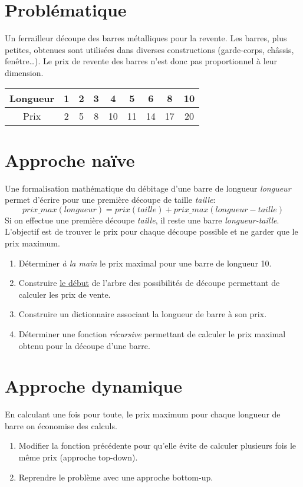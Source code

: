 \documentclass[a4paper,11pt]{article}
\begin{document}
\section{Problématique}
Un ferrailleur découpe des barres métalliques pour la revente. Les barres, plus petites, obtenues sont utilisées dans diverses constructions (garde-corps, châssis, fenêtre\dots). Le prix de revente des barres n'est donc pas proportionnel à leur dimension.
\begin{center}
    \begin{tabular}{|*{9}{c|}}
        \hline
        Longueur & 1 & 2 & 3 & 4 & 5 & 6 & 8 & 10 \\
        \hline
        Prix & 2 & 5 & 8 & 10 & 11 & 14 & 17 & 20 \\
        \hline
    \end{tabular}
\end{center}
\begin{center}
    
\end{center}
\section{Approche naïve}
Une formalisation mathématique du débitage d'une barre de longueur \emph{longueur} permet d'écrire pour une première découpe de taille \emph{taille}:
$$prix\_max(longueur) = prix(taille) + prix\_max(longueur-taille)$$
Si on effectue une première découpe \emph{taille}, il reste une barre \emph{longueur-taille}. L'objectif est de trouver le prix pour chaque découpe possible et ne garder que le prix maximum.
\begin{activite}
\begin{enumerate}
    \item Déterminer \emph{à la main} le prix maximal pour une barre de longueur 10.
    \item Construire \underline{le début} de l'arbre des possibilités de découpe permettant de calculer les prix de vente.
    \item Construire un dictionnaire associant la longueur de barre à son prix.
    \item Déterminer une fonction \emph{récursive} permettant de calculer le prix maximal obtenu pour la découpe d'une barre.   
\end{enumerate}
\end{activite}
\section{Approche dynamique}
En calculant une fois pour toute, le prix maximum pour chaque longueur de barre on économise des calculs.
\begin{activite}
\begin{enumerate}
    \item Modifier la fonction précédente pour qu'elle évite de calculer plusieurs fois le même prix (approche top-down).
    \item Reprendre le problème avec une approche bottom-up.
\end{enumerate}
\end{activite}
\end{document}
